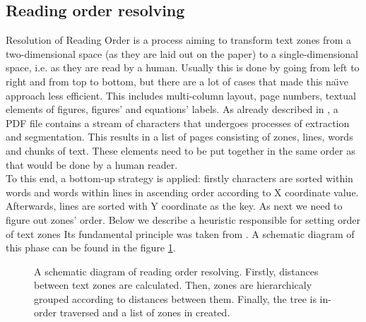 \subsection{Reading order resolving}\label{sec:reading_order}
Resolution of Reading Order is a process aiming to transform text zones from a two-dimensional space (as they are laid out on the paper) to a single-dimensional space, i.e. as they are read by a human. Usually this is done by going from left to right and from top to bottom, but there are a lot of cases that made this na\"\i ve approach less efficient. This includes multi-column layout, page numbers, textual elements of figures, figures' and equations' labels.
\qquad
As already described in \cite{DominikaTkaczykPaweSzostekMateuszFedoryszakPiotrJanDendek2014}, a PDF file contains a stream of characters that undergoes processes of extraction and segmentation. This results in a list of pages consisting of zones, lines, words and chunks of text. These elements need to be put together in the same order as that would be done by a human reader.\\
To this end, a bottom-up strategy is applied: firstly characters are sorted within words and words within lines in ascending order according to X coordinate value. Afterwards, lines are sorted with Y coordinate as the key. As next we need to figure out zones' order. Below we describe a heuristic responsible for setting order of text zones Its fundamental principle was taken from \cite{ROR_source}. A schematic diagram of this phase can be found in the figure \ref{fig:reading_order}.
\begin{figure}[]
  \centering
  
  \caption{A schematic diagram of reading order resolving. Firstly, distances between text zones are calculated. Then, zones are hierarchicaly grouped according to distances between them. Finally, the tree is in-order traversed and a list of zones in created.}
  \label{fig:reading_order}
\end{figure}
